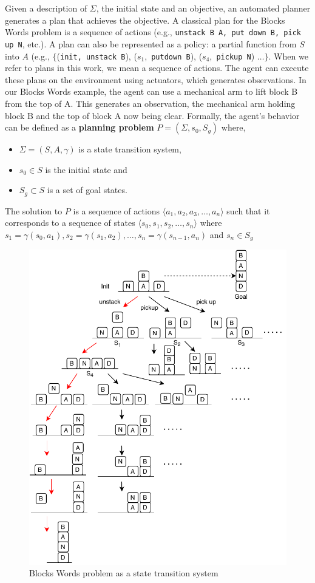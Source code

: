 Given a description of $\Sigma$, the initial state and an objective, an automated planner generates a plan that achieves the objective. A classical plan for the Blocks Words problem is a sequence of actions (e.g., \texttt{unstack B A, put down B, pick up N}, etc.). A plan can also be represented as a policy: a partial function from $S$ into $A$ (e.g.,  $\lbrace$(\texttt{init, unstack B}), ($s_1$,\texttt{ putdown B}), ($s_4$,\texttt{ pickup N}) $\ldots\rbrace$. When we refer to plans in this work, we mean a sequence of actions. The agent can execute these plans on the environment using actuators, which generates observations. In our Blocks Words example, the agent can use a mechanical arm to lift block B from the top of A. This generates an observation, the mechanical arm holding block B and the top of block A now being clear. Formally, the agent's behavior can be defined as a \textbf{planning problem} $P=(\Sigma, s_0, S_g)$ where, 
\begin{itemize}
\item $\Sigma=(S,A,\gamma)$ is a state transition system,
\item $s_0\in S$ is the initial state and
\item $S_g\subset S$ is a set of goal states.
\end{itemize}
\noindent The solution to $P$ is a sequence of actions $\langle a_1, a_2, a_3, \ldots, a_n\rangle$ such that it corresponds to a sequence of states $\langle s_0, s_1, s_2, \ldots, s_n\rangle$ where $s_1=\gamma(s_0,a_1), s_2=\gamma(s_1,a_2), \ldots, s_n=\gamma(s_{n-1},a_n)$ and $s_n \in S_g$

\begin{figure}[ht]
  \centering
\includegraphics[width=0.6\columnwidth]{img/bw.pdf}
  \caption{Blocks Words problem as a state transition system}
  \label{fig:blockswords}
\end{figure} 

